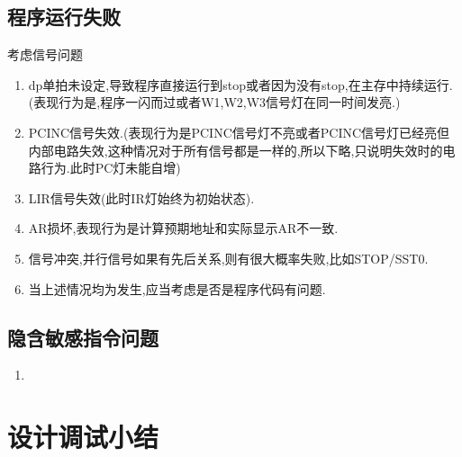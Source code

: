 \documentclass[UTF8]{ctexart}
\begin{document}
\subsection{程序运行失败}
考虑信号问题
\begin{enumerate}[1]
	\item dp单拍未设定,导致程序直接运行到stop或者因为没有stop,在主存中持续运行.(表现行为是,程序一闪而过或者W1,W2,W3信号灯在同一时间发亮.)
	\item PCINC信号失效.(表现行为是PCINC信号灯不亮或者PCINC信号灯已经亮但内部电路失效,这种情况对于所有信号都是一样的,所以下略,只说明失效时的电路行为.此时PC灯未能自增)
	\item LIR信号失效(此时IR灯始终为初始状态).
	\item AR损坏,表现行为是计算预期地址和实际显示AR不一致.
	\item 信号冲突,并行信号如果有先后关系,则有很大概率失败,比如STOP/SST0.
	\item 当上述情况均为发生,应当考虑是否是程序代码有问题.
\end{enumerate}
\subsection{隐含敏感指令问题}
\begin{enumerate}
	\item 
\end{enumerate}
\section{设计调试小结}
\end{document}
